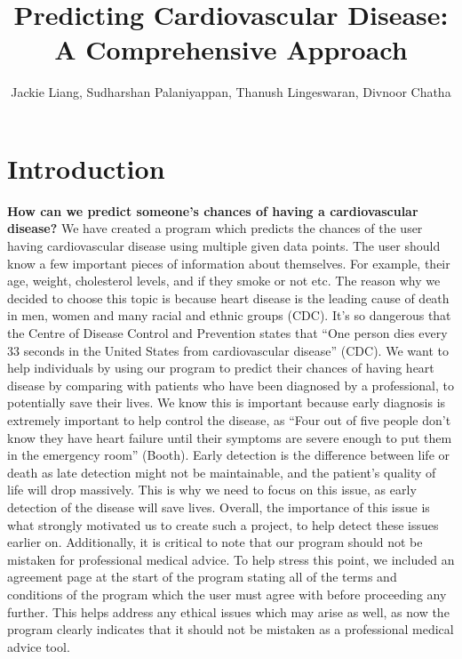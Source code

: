 ﻿\documentclass[12pt]{article}
\title{Predicting Cardiovascular Disease: A Comprehensive Approach}
\author{Jackie Liang, Sudharshan Palaniyappan, Thanush Lingeswaran, Divnoor Chatha}
\date{}
\begin{document}
\maketitle

\section*{Introduction}
\textbf{How can we predict someone’s chances of having a cardiovascular disease?}
We have created a program which predicts the chances of the user having cardiovascular disease using multiple given data points. The user should know a few important pieces of information about themselves. For example, their age, weight, cholesterol levels, and if they smoke or not etc. The reason why we decided to choose this topic is because heart disease is the leading cause of death in men, women and many racial and ethnic groups (CDC). It’s so dangerous that the Centre of Disease Control and Prevention states that “One person dies every 33 seconds in the United States from cardiovascular disease” (CDC). We want to help individuals by using our program to predict their chances of having heart disease by comparing with patients who have been diagnosed by a professional, to potentially save their lives. We know this is important because early diagnosis is extremely important to help control the disease, as “Four out of five people don’t know they have heart failure until their symptoms are severe enough to put them in the emergency room” (Booth). Early detection is the difference between life or death as late detection might not be maintainable, and the patient’s quality of life will drop massively. This is why we need to focus on this issue, as early detection of the disease will save lives. Overall, the importance of this issue is what strongly motivated us to create such a project, to help detect these issues earlier on. Additionally, it is critical to note that our program should not be mistaken for professional medical advice. To help stress this point, we included an agreement page at the start of the program stating all of the terms and conditions of the program which the user must agree with before proceeding any further. This helps address any ethical issues which may arise as well, as now the program clearly indicates that it should not be mistaken as a professional medical advice tool.
\end{document}
